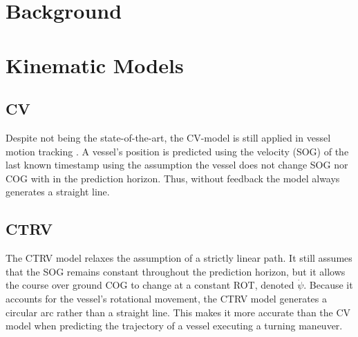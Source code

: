 
\section{Background} 
\label{chap:background}
\section{Kinematic Models} 
    \subsection{CV}
    Despite not being the state-of-the-art, the \acf{CV}-model  is still applied in vessel motion tracking  \parencite{8693856CV}. A vessel's position is predicted using the velocity (\ac{SOG}) of the last known timestamp using the assumption the vessel does not change \ac{SOG} nor \ac{COG} with in the prediction horizon. Thus, without feedback the model always generates a straight line.
    \subsection{CTRV}
    The \acf{CTRV} model relaxes the assumption of a strictly linear path. It still assumes that the \ac{SOG} remains constant throughout the prediction horizon, but it allows the course over ground \ac{COG} to change at a constant \acf{ROT}, denoted $\dot{\psi}$. Because it accounts for the vessel's rotational movement, the \ac{CTRV} model generates a circular arc rather than a straight line. This makes it  more accurate than the \ac{CV} model when predicting the trajectory of a vessel executing a turning maneuver.
    

